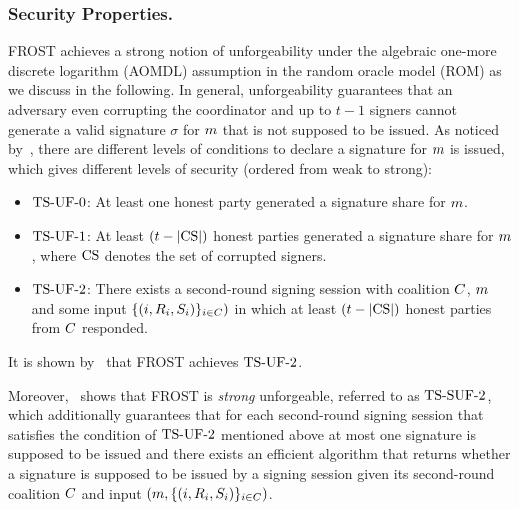\subsubsection{Security Properties.}
FROST achieves a strong notion of unforgeability under the algebraic one-more discrete logarithm (AOMDL) assumption in the random oracle model (ROM) as we discuss in the following.
In general, unforgeability guarantees that an adversary even corrupting the coordinator and up to $t-1$ signers cannot generate a valid signature $\sigma$ for $m$ that is not supposed to be issued. As noticed by~\cite{BellareCKMTZ22}, there are different levels of conditions to declare a signature for $m$ is issued, which gives different levels of security (ordered from weak to strong):
\begin{itemize}
\item $\mathrm{TS}\mbox{-}\mathrm{UF}\mbox{-}{0}$: At least one honest party generated a signature share for $m$.
\item $\mathrm{TS}\mbox{-}\mathrm{UF}\mbox{-}{1}$: At least $(t - |\mathrm{CS}|)$ honest parties generated a signature share for $m$, where $\mathrm{CS}$ denotes the set of corrupted signers.
\item $\mathrm{TS}\mbox{-}\mathrm{UF}\mbox{-}{2}$: There exists a second-round signing session with coalition $C$, $m$ and some input $\{ (i, R_i, S_i)\}_{i \in C})$ in which at least $(t - |\mathrm{CS}|)$ honest parties from $C$ responded.
\end{itemize}
It is shown by~\cite{BellareCKMTZ22} that FROST achieves $\mathrm{TS}\mbox{-}\mathrm{UF}\mbox{-}{2}$.

Moreover,~\cite{BellareCKMTZ22} shows that FROST is \emph{strong} unforgeable, referred to as $\mathrm{TS}\mbox{-}\mathrm{SUF}\mbox{-}{2}$, which additionally guarantees that for each second-round signing session that satisfies the condition of $\mathrm{TS}\mbox{-}\mathrm{UF}\mbox{-}{2}$ mentioned above at most one signature is supposed to be issued and there exists an efficient algorithm that returns whether a signature is supposed to be issued by a signing session given its second-round coalition $C$ and input $(m, \{ (i, R_i, S_i)\}_{i \in C})$.



